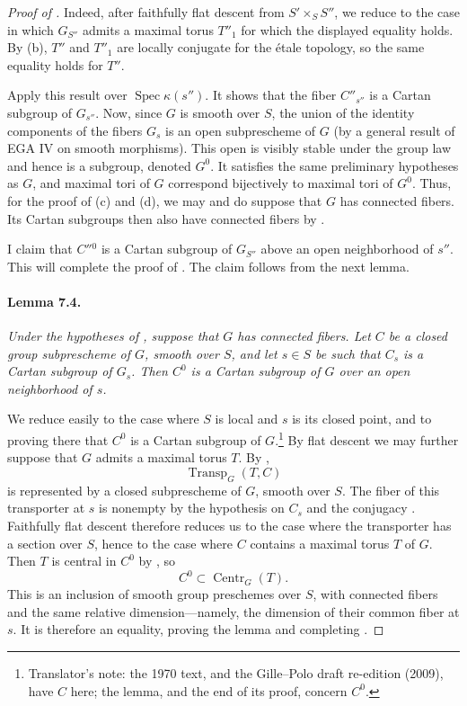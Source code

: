 \begin{proof}[Proof of ]
Indeed, after faithfully flat descent from \(S'\times_S S''\), we
reduce to the case in which \(G_{S''}\) admits a maximal torus
\(T''_1\) for which the displayed equality holds. By
\textup{(b)}, \(T''\) and \(T''_1\) are locally conjugate for the
étale topology, so the same equality holds for \(T''\).

Apply this result over \(\operatorname{Spec}\kappa(s'')\). It shows
that the fiber \(C''_{s''}\) is a Cartan subgroup of \(G_{s''}\).
Now, since \(G\) is smooth over \(S\), the union of the identity
components of the fibers \(G_s\) is an open subprescheme of \(G\)
(by a general result of EGA IV on smooth morphisms). This open is visibly
stable under the group law and hence is a subgroup, denoted \(G^0\).
It satisfies the same preliminary hypotheses as \(G\), and maximal
tori of \(G\) correspond bijectively to maximal tori of \(G^0\).
Thus, for the proof of \textup{(c)} and \textup{(d)}, we may and do
suppose that \(G\) has connected fibers. Its Cartan subgroups then
also have connected fibers by .

I claim that \(C''{}^0\) is a Cartan subgroup of \(G_{S''}\) above
an open neighborhood of \(s''\). This will complete the proof of
\textup{}. The claim follows from the next lemma.

\paragraph{\textbf{Lemma 7.4.}}
\emph{Under the hypotheses of , suppose that \(G\) has connected
fibers. Let \(C\) be a closed group subprescheme of \(G\), smooth
over \(S\), and let \(s\in S\) be such that \(C_s\) is a Cartan
subgroup of \(G_s\). Then \(C^0\) is a Cartan subgroup of \(G\) over
an open neighborhood of \(s\).}

We reduce easily to the case where \(S\) is local and \(s\) is its
closed point, and to proving there that \(C^0\) is a Cartan subgroup
of \(G\).\footnote{Translator's note: the 1970 text, and the Gille--Polo
draft re-edition (2009), have \(C\) here; the lemma, and the end of its
proof, concern \(C^0\).} By flat descent we may further suppose that \(G\) admits a
maximal torus \(T\). By ,
\[
  \operatorname{Transp}_G(T,C)
\]
is represented by a closed subprescheme of \(G\), smooth over \(S\).
The fiber of this transporter at \(s\) is nonempty by the hypothesis
on \(C_s\) and the conjugacy . Faithfully flat descent
therefore reduces us to the case where the transporter has a section
over \(S\), hence to the case where \(C\) contains a maximal torus
\(T\) of \(G\). Then \(T\) is central in \(C^0\) by , so
\[
  C^0\subset \operatorname{Centr}_G(T).
\]
This is an inclusion of smooth group preschemes over \(S\), with
connected fibers and the same relative dimension---namely, the
dimension of their common fiber at \(s\). It is therefore an
equality, proving the lemma and completing \textup{}.


\end{proof}
